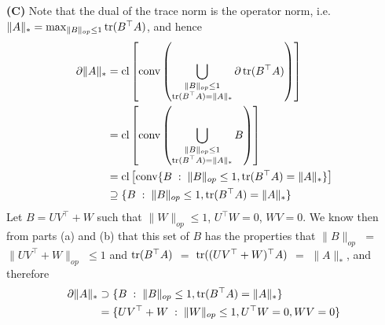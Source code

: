 \textbf{(C) } Note that the dual of the trace norm is the operator norm, i.e.
$\|A\|_* = \max_{\|B\|_{op} \leq 1} \operatorname{tr}(B^\top A)$, and hence
\begin{align}
    \partial \|A\|_* &= \text{cl} \left[ \text{conv}\left(
        \bigcup_{\substack{\|B\|_{op} \leq 1 \\ \operatorname{tr}(B^\top A) = \|A\|_*}} \partial
        \operatorname{tr}(B^\top A)  \right) \right] \\
    &= \text{cl} \left[ \text{conv}\left( \bigcup_{\substack{\|B\|_{op} \leq 1
        \\ \operatorname{tr}(B^\top A) = \|A\|_*}} B \right) \right] \\
    &=  \text{cl} \left[ \text{conv} \{ B \hspace{1mm}:\hspace{1mm}
        \|B\|_{op} \leq 1, \operatorname{tr}(B^\top A) = \|A\|_* \} \right]\\
    &\supseteq \{ B \hspace{1mm}:\hspace{1mm} \|B\|_{op} \leq 1, \operatorname{tr}(B^\top A)
        = \|A\|_* \}
\end{align}
Let $B = U V^\top + W$ such that $\|W\|_{op} \leq 1$, $U^\top W = 0$, $WV = 0$.
We know then from parts (a) and (b) that this set of $B$ has the properties that
$\|B\|_{op}$ $=$ $\|U V^\top + W\|_{op}$ $\leq 1$ and $\operatorname{tr}(B^\top A)$ $=$
$\operatorname{tr}((U V^\top + W)^\top A)$ $=$ $\|A\|_*$, and therefore
\begin{align}
    \partial \|A\|_* &\supset \{ B \hspace{1mm}:\hspace{1mm} \|B\|_{op} \leq 1, \operatorname{tr}(B^\top A)
        = \|A\|_* \}\\
    &= \{ U V^\top + W \hspace{1mm}:\hspace{1mm} \|W\|_{op} \leq 1, U^\top W =
        0, W V = 0 \}
\end{align}


